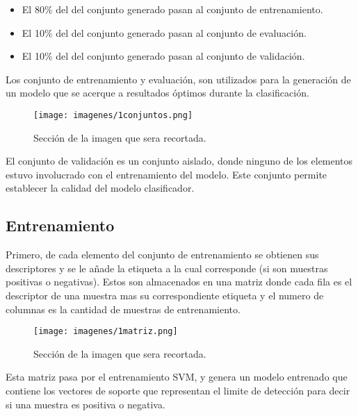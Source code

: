 \begin{itemize}
\item El 80\% del del conjunto generado pasan al conjunto de entrenamiento.
\item El 10\% del del conjunto generado pasan al conjunto de evaluación.
\item El 10\% del del conjunto generado pasan al conjunto de validación.
\end{itemize}

\noindent Los conjunto de entrenamiento y evaluación, son utilizados para la generación de un modelo que se acerque a resultados óptimos durante la clasificación.

\begin{figure}[H]
\centering
{\texttt{[image: imagenes/1conjuntos.png]}}
\caption{Sección de la imagen que sera recortada.}
\label{fig:sectorRecorte}
\end{figure}

\noindent El conjunto de validación es un conjunto aislado, donde ninguno de los elementos estuvo involucrado con el entrenamiento del modelo. Este conjunto permite establecer la calidad del modelo clasificador.

\subsection{Entrenamiento}

\noindent Primero, de cada elemento del conjunto de entrenamiento se obtienen sus descriptores y se le añade la etiqueta a la cual corresponde (si son muestras positivas o negativas). Estos son almacenados en una matriz donde cada fila es el descriptor de una muestra mas su correspondiente etiqueta y el numero de columnas es la cantidad de muestras de entrenamiento.

\begin{figure}[H]
\centering
{\texttt{[image: imagenes/1matriz.png]}}
\caption{Sección de la imagen que sera recortada.}
\label{fig:sectorRecorte}
\end{figure}

\noindent Esta matriz pasa por el entrenamiento SVM, y genera un modelo entrenado que contiene los vectores de soporte que representan el limite de detección para decir si una muestra es positiva o negativa.

